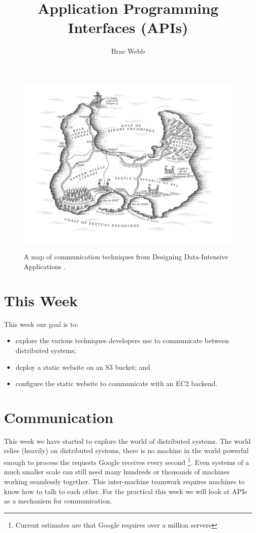 \documentclass{csse4400}
\title{Application Programming Interfaces (APIs)}
\author{Brae Webb}
\date{\week{5}}
\begin{document}
\maketitle

\begin{figure}[h]
  \href{https://www.oreilly.com/library/view/designing-data-intensive-applications/9781491903063/ch04.html}{
    \includegraphics[width=\textwidth]{images/communication}
  }
\caption{A map of communication techniques from Designing Data-Intensive Applications \cite{data-intensive}.}
\end{figure}

\section{This Week}
This week our goal is to:
\begin{itemize}
  \item explore the various techniques developers use to communicate between distributed systems;
  \item deploy a static website on an S3 bucket; and
  \item configure the static website to communicate with an EC2 backend.
\end{itemize}



\section{Communication}
This week we have started to explore the world of distributed systems.
The world relies (heavily) on distributed systems,
there is no machine in the world powerful enough to process the requests Google receives every second%
\footnote{Current estimates are that Google requires over a million servers}.
Even systems of a much smaller scale can still need many hundreds or thousands of machines working seamlessly together.
This inter-machine teamwork requires machines to know how to talk to each other.
For the practical this week we will look at APIs as a mechanism for communication.
\end{document}
